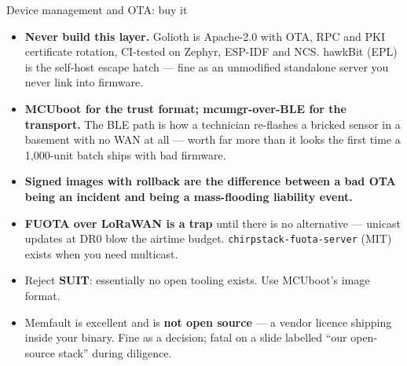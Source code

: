 \documentclass[aspectratio=169,t,10pt,xcolor={table,svgnames}]{beamer}
\begin{document}
\begin{frame}{Device management and OTA: buy it}
  \begin{itemize}
    \item \textbf{Never build this layer.} Golioth is Apache-2.0 with OTA, RPC and PKI certificate
          rotation, CI-tested on Zephyr, ESP-IDF and NCS. hawkBit (EPL) is the self-host escape
          hatch --- fine as an unmodified standalone server you never link into firmware.
    \item \textbf{MCUboot for the trust format; mcumgr-over-BLE for the transport.} The BLE path is
          how a technician re-flashes a bricked sensor in a basement with no WAN at all --- worth far
          more than it looks the first time a 1,000-unit batch ships with bad firmware.
    \item \textbf{Signed images with rollback are the difference between a bad OTA being an incident
          and being a mass-flooding liability event.}
    \item \textbf{FUOTA over LoRaWAN is a trap} until there is no alternative --- unicast updates at
          DR0 blow the airtime budget. \texttt{chirpstack-fuota-server} (MIT) exists when you need
          multicast.
    \item Reject \textbf{SUIT}: essentially no open tooling exists. Use MCUboot's image format.
    \item Memfault is excellent and is \textbf{not open source} --- a vendor licence shipping inside
          your binary. Fine as a decision; fatal on a slide labelled ``our open-source stack''
          during diligence.
  \end{itemize}
\end{frame}
\end{document}
